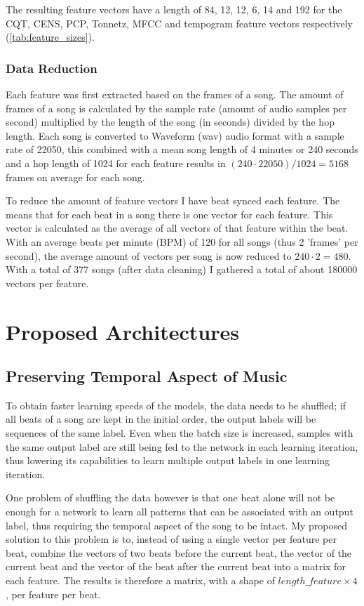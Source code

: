 The resulting feature vectors have a length of 84, 12, 12, 6, 14 and 192 for the CQT, CENS, PCP, Tonnetz, MFCC and tempogram feature vectors respectively (\autoref{tab:feature_sizes}).

\subsubsection{Data Reduction}
Each feature was first extracted based on the frames of a song. The amount of frames of a song is calculated by the sample rate (amount of audio samples per second) multiplied by the length of the song (in seconds) divided by the hop length. Each song is converted to Waveform (wav) audio format with a sample rate of 22050, this combined with a mean song length of 4 minutes or 240 seconds and a hop length of 1024 for each feature results in $(240\cdot22050)/1024=5168$ frames on average for each song. 

To reduce the amount of feature vectors I have beat synced each feature. The means that for each beat in a song there is one vector for each feature. This vector is calculated as the average of all vectors of that feature within the beat. With an average beats per minute (BPM) of 120 for all songs (thus 2 'frames' per second), the average amount of vectors per song is now reduced to $240\cdot2=480$. With a total of 377 songs (after data cleaning) I gathered a total of about 180000 vectors per feature.


\section{Proposed Architectures}
\subsection{Preserving Temporal Aspect of Music}
To obtain faster learning speeds of the models, the data needs to be shuffled; if all beats of a song are kept in the initial order, the output labels will be sequences of the same label. Even when the batch size is increased, samples with the same output label are still being fed to the network in each learning iteration, thus lowering its capabilities to learn multiple output labels in one learning iteration.

One problem of shuffling the data however is that one beat alone will not be enough for a network to learn all patterns that can be associated with an output label, thus requiring the temporal aspect of the song to be intact. My proposed solution to this problem is to, instead of using a single vector per feature per beat, combine the vectors of two beats before the current beat, the vector of the current beat and the vector of the beat after the current beat into a matrix for each feature. The results is therefore a matrix, with a shape of $length\_feature\times4$, per feature per beat.

